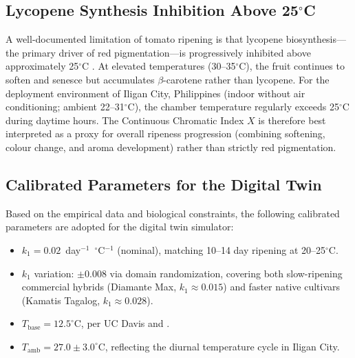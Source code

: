     \subsection{Lycopene Synthesis Inhibition Above 25$^{\circ}$C}

    A well-documented limitation of tomato ripening is that lycopene biosynthesis---the primary driver of red pigmentation---is progressively inhibited above approximately 25$^{\circ}$C \citep{saltveit2005}. At elevated temperatures (30--35$^{\circ}$C), the fruit continues to soften and senesce but accumulates $\beta$-carotene rather than lycopene. For the deployment environment of Iligan City, Philippines (indoor without air conditioning; ambient 22--31$^{\circ}$C), the chamber temperature regularly exceeds 25$^{\circ}$C during daytime hours. The Continuous Chromatic Index $X$ is therefore best interpreted as a proxy for overall ripeness progression (combining softening, colour change, and aroma development) rather than strictly red pigmentation.

    \subsection{Calibrated Parameters for the Digital Twin}

    Based on the empirical data and biological constraints, the following calibrated parameters are adopted for the digital twin simulator:

    \begin{itemize}
        \item $k_1 = 0.02$~day$^{-1}$~$^{\circ}$C$^{-1}$ (nominal), matching 10--14 day ripening at 20--25$^{\circ}$C.
        \item $k_1$ variation: $\pm 0.008$ via domain randomization, covering both slow-ripening commercial hybrids (Diamante Max, $k_1 \approx 0.015$) and faster native cultivars (Kamatis Tagalog, $k_1 \approx 0.028$).
        \item $T_{\text{base}} = 12.5^{\circ}$C, per UC Davis and \citet{saltveit2005}.
        \item $T_{\text{amb}} = 27.0 \pm 3.0^{\circ}$C, reflecting the diurnal temperature cycle in Iligan City.
    \end{itemize}



